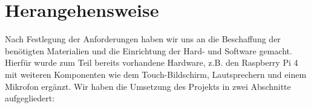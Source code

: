 \section{Herangehensweise}\label{herangehensweise}
Nach Festlegung der Anforderungen haben wir uns an die Beschaffung der benötigten Materialien und die Einrichtung der Hard- und Software gemacht. 
Hierfür wurde zum Teil bereits vorhandene Hardware, z.B. den Raspberry Pi 4 mit weiteren Komponenten wie dem Touch-Bildschirm, Lautsprechern und einem Mikrofon ergänzt. 
Wir haben die Umsetzung des Projekts in zwei Abschnitte aufgegliedert:

\newpage

\newpage